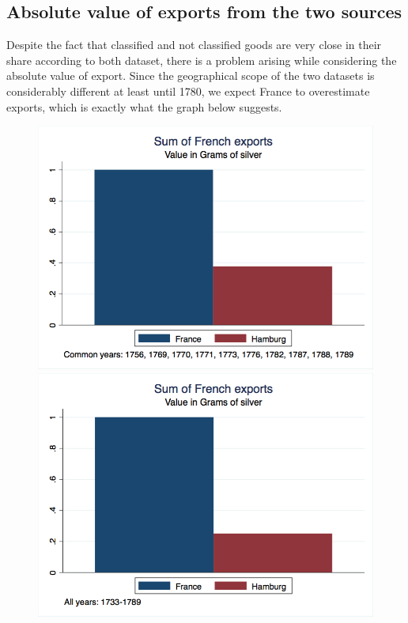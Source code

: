 \documentclass[12pt,a4paper,titlepage,english]{article}
\begin{document}
\subsection{Absolute value of exports from the two sources}
Despite the fact that classified and not classified goods are very close in their share according to both dataset, there is a problem arising while considering the absolute value of export. Since the geographical scope of the two datasets is considerably different at least until 1780, we expect France to overestimate exports, which is exactly what the graph below suggests.
\begin{figure}
\includegraphics[scale=.28]{value_total_fr_hb_commonyears.png}
\includegraphics[scale=.28]{value_total_fr_hb.png}
\end{figure}
\end{document}
